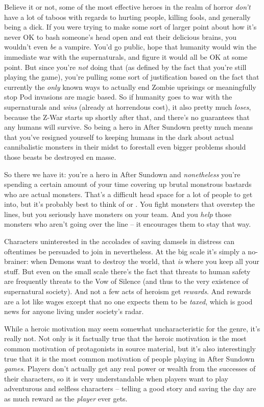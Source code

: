Believe it or not, some of the most effective heroes in the realm of horror \textit{don't} have a lot of taboos with regards to hurting people, killing fools, and generally being a dick. If you were trying to make some sort of larger point about how it's never OK to bash someone's head open and eat their delicious brains, you wouldn't even \textit{be} a vampire. You'd go public, hope that humanity would win the immediate war with the supernaturals, and figure it would all be OK at some point. But since you're \textit{not} doing that (as defined by the fact that you're still playing the game), you're pulling some sort of justification based on the fact that currently the \textit{only} known ways to actually end Zombie uprisings or meaningfully stop Pod invasions are magic based. So if humanity goes to war with the supernaturals and \textit{wins} (already at horrendous cost), it also pretty much \textit{loses}, because the Z-War starts up shortly after that, and there's no guarantees that any humans will survive. So being a hero in After Sundown pretty much means that you've resigned yourself to keeping humans in the dark about actual cannibalistic monsters in their midst to forestall even bigger problems should those beasts be destroyed en masse. 

So there we have it: you're a hero in After Sundown and \textit{nonetheless} you're spending a certain amount of your time covering up brutal monstrous bastards who are actual monsters. That's a difficult head space for a lot of people to get into, but it's probably best to think of  or . You fight monsters that overstep the lines, but you seriously have monsters on your team. And you \textit{help} those monsters who aren't going over the line -- it encourages them to stay that way.

Characters uninterested in the accolades of saving damsels in distress can oftentimes be persuaded to join in nevertheless. At the big scale it's simply a no-brainer: when Demons want to destroy the world, that \textit{is} where you keep all your stuff. But even on the small scale there's the fact that threats to human safety are frequently threats to the Vow of Silence (and thus to the very existence of supernatural society). And not a few acts of heroism get \textit{rewards}. And rewards are a lot like wages except that no one expects them to be \textit{taxed}, which is good news for anyone living under society's radar.

While a heroic motivation may seem somewhat uncharacteristic for the genre, it's really not. Not only is it factually true that the heroic motivation is the most common motivation of protagonists in source material, but it's also interestingly true that it is the most common motivation of people playing in After Sundown \textit{games}. Players don't actually get any real power or wealth from the successes of their characters, so it is very understandable when players want to play adventurous and selfless characters -- telling a good story and saving the day are as much reward as the \textit{player} ever gets.

